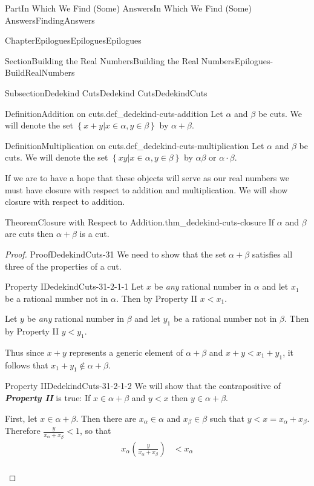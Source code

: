 \documentclass[oneside,10pt,]{book}
\newcommand{\alert}[1]{\textbf{\textit{#1}}}
\numberwithin{equation}{part}
\newcommand{\lt}{<}
\newcommand{\amp}{&}
\begin{document}
\begin{partptx}{Part}{In Which We Find (Some) Answers}{}{In Which We Find (Some) Answers}{}{}{FindingAnswers}
\begin{chapterptx}{Chapter}{Epilogues}{}{Epilogues}{}{}{Epilogues}
\begin{sectionptx}{Section}{Building the Real Numbers}{}{Building the Real Numbers}{}{}{Epilogues-BuildRealNumbers}
\begin{subsectionptx}{Subsection}{Dedekind Cuts}{}{Dedekind Cuts}{}{}{DedekindCuts}
\begin{definition}{Definition}{Addition on cuts.}{def_dedekind-cuts-addition}
Let \(\alpha\) and \(\beta\) be cuts.  We will denote the set \(\left\{x+y|x\in\alpha,
y\in\beta\right\}\) by \(\alpha+\beta\).%
\end{definition}
\begin{definition}{Definition}{Multiplication on cuts.}{def_dedekind-cuts-multiplication}%
%
Let \(\alpha\) and \(\beta\) be cuts.  We will denote the set \(\left\{xy|x\in\alpha,
y\in\beta\right\}\) by \(\alpha\beta \text{ or }
\alpha\cdot\beta\).%
\end{definition}
If we are to have a hope that these objects will serve as our real numbers we must have closure with respect to addition and multiplication.  We will show closure with respect to addition.%
\begin{theorem}{Theorem}{Closure with Respect to Addition.}{}{thm_dedekind-cuts-closure}%
%
If \(\alpha\) and \(\beta\) are cuts then \(\alpha+\beta\) is a cut.%
\end{theorem}
\begin{proof}{Proof}{}{DedekindCuts-31}
We need to show that the set \(\alpha+\beta\) satisfies all three of the properties of a cut.%
\par
%
\begin{descriptionlist}
\begin{dlimedium}{Property I}{DedekindCuts-31-2-1-1}%
Let \(x\) be \emph{any} rational number in \(\alpha\) and let \(x_1\) be a rational number not in \(\alpha\).  Then by Property II \(x\lt
x_1\).%
\par
Let \(y\) be \emph{any} rational number in \(\beta\) and let \(y_1\) be a rational number not in \(\beta\).  Then by Property II \(y\lt
y_1\).%
\par
Thus since \(x+y\) represents a generic element of \(\alpha+\beta\) and \(x+y\lt x_1+y_1\), it follows that \(x_1+y_1\not\in\alpha+\beta\).%
\end{dlimedium}%
\begin{dlimedium}{Property II}{DedekindCuts-31-2-1-2}%
We will show that the contrapositive of \alert{Property II} is true: If \(x\in\alpha+\beta\) and \(y\lt x\) then \(y\in\alpha+\beta\).%
\par
First, let \(x\in\alpha+\beta\).  Then there are \(x_\alpha\in\alpha\) and \(x_\beta\in\beta\) such that \(y\lt x=x_\alpha+x_\beta\).  Therefore \(\frac{y}{x_\alpha+x_\beta}\lt 1\), so that%
\begin{align*}
x_\alpha\left(\frac{y}{x_\alpha+x_\beta}\right)\amp \lt  x_\alpha\\

\end{align*}
\end{dlimedium}
\end{descriptionlist}
\end{proof}
\end{subsectionptx}
\end{sectionptx}
\end{chapterptx}
\end{partptx}
\end{document}

